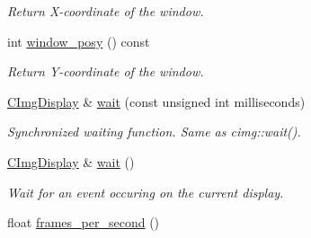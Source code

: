 \begin{DoxyCompactItemize}
\begin{DoxyCompactList}\small\item\em Return X-\/coordinate of the window. \end{DoxyCompactList}\item 
\hypertarget{structcimg__library_1_1_c_img_display_a5b50e0d2a2f29f0e8fb574ed505903b5}{int \hyperlink{structcimg__library_1_1_c_img_display_a5b50e0d2a2f29f0e8fb574ed505903b5}{window\-\_\-posy} () const }\label{structcimg__library_1_1_c_img_display_a5b50e0d2a2f29f0e8fb574ed505903b5}

\begin{DoxyCompactList}\small\item\em Return Y-\/coordinate of the window. \end{DoxyCompactList}\item 
\hyperlink{structcimg__library_1_1_c_img_display}{C\-Img\-Display} \& \hyperlink{structcimg__library_1_1_c_img_display_a96efe590da16f2e5b4510b2fde423c67}{wait} (const unsigned int milliseconds)
\begin{DoxyCompactList}\small\item\em Synchronized waiting function. Same as cimg\-::wait(). \end{DoxyCompactList}\item 
\hypertarget{structcimg__library_1_1_c_img_display_aa5e3e882409a68ca12a6aacfcbd09ed3}{\hyperlink{structcimg__library_1_1_c_img_display}{C\-Img\-Display} \& \hyperlink{structcimg__library_1_1_c_img_display_aa5e3e882409a68ca12a6aacfcbd09ed3}{wait} ()}\label{structcimg__library_1_1_c_img_display_aa5e3e882409a68ca12a6aacfcbd09ed3}

\begin{DoxyCompactList}\small\item\em Wait for an event occuring on the current display. \end{DoxyCompactList}\item 
\hypertarget{structcimg__library_1_1_c_img_display_a07f1827308cf863d49883a83de65bf8d}{float \hyperlink{structcimg__library_1_1_c_img_display_a07f1827308cf863d49883a83de65bf8d}{frames\-\_\-per\-\_\-second} ()}\label{structcimg__library_1_1_c_img_display_a07f1827308cf863d49883a83de65bf8d}


\end{DoxyCompactItemize}

